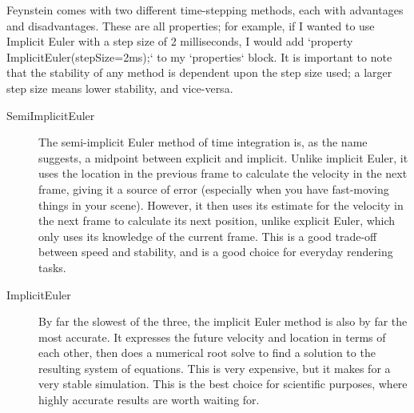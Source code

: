 Feynstein comes with two different time-stepping methods, each with
advantages and disadvantages. These are all properties; for example,
if I wanted to use Implicit Euler with a step size of 2 milliseconds,
I would add `property ImplicitEuler(stepSize=2ms);` to my `properties`
block. It is important to note that the stability of any method is
dependent upon the step size used; a larger step size means lower
stability, and vice-versa.

\begin{description}
\item[SemiImplicitEuler] The semi-implicit Euler method of time integration
  is, as the name suggests, a midpoint between explicit and
  implicit. Unlike implicit Euler, it uses the location in the
  previous frame to calculate the velocity in the next frame, giving
  it a source of error (especially when you have fast-moving things in
  your scene). However, it then uses its estimate for the velocity in
  the next frame to calculate its next position, unlike explicit
  Euler, which only uses its knowledge of the current frame. This is a
  good trade-off between speed and stability, and is a good choice for
  everyday rendering tasks.

\item[ImplicitEuler] By far the slowest of the three, the implicit Euler
  method is also by far the most accurate. It expresses the future
  velocity and location in terms of each other, then does a numerical
  root solve to find a solution to the resulting system of
  equations. This is very expensive, but it makes for a very stable
  simulation. This is the best choice for scientific purposes, where
  highly accurate results are worth waiting for.
\end{description}
